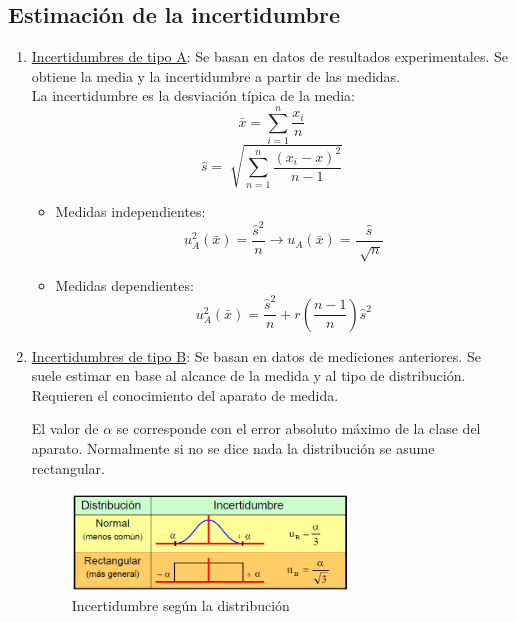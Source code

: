 \subsection{Estimación de la incertidumbre}
\begin{enumerate}
	\item \underline{Incertidumbres de tipo A}: Se basan en datos de resultados experimentales. Se obtiene la media y la incertidumbre a partir de las medidas.
	\\La incertidumbre es la desviación típica de la media:
	\[ \bar x = \sum_{i=1}^{n} \frac{x_i}{n} \]
	\[\hat{s}=\sqrt[]{\sum_{n=1}^n \frac{(x_i -x)^2}{n-1}} \]
	\begin{itemize}
		\item Medidas independientes:
		\[ u_A^2(\bar x) =  \frac{\hat{s}^2}{n} \rightarrow u_A(\bar x) =  \frac{\hat{s}}{\sqrt[]{n}}\]
		\item Medidas dependientes:
		\[ u_A^2(\bar x) =  \frac{\hat{s}^2}{n} + r \left({\frac{n-1}{n}}\right)\hat{s}^2\]
	\end{itemize}
	\item \underline{Incertidumbres de tipo B}: Se basan en datos de mediciones anteriores. Se suele estimar en base al alcance de la medida y al tipo de distribución. Requieren el conocimiento del aparato de medida.
	\begin{flushleft}
	El valor de $\alpha$ se corresponde con el error absoluto máximo de la clase del aparato. Normalmente si no se dice nada la distribución se asume rectangular.
\end{flushleft}
		\begin{figure}[H]
		\centering
		\includegraphics[width=0.7\textwidth]{imagenesTema1/tipob.png}  
		\caption{Incertidumbre según la distribución}
		\label{fig:sample}
	\end{figure}
	
\end{enumerate}
\newpage
